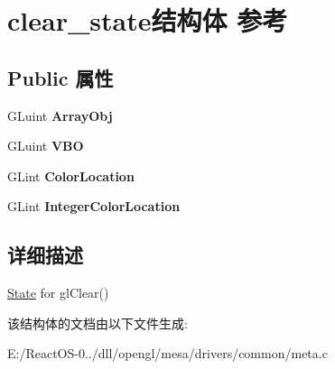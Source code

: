 \hypertarget{structclear__state}{}\section{clear\+\_\+state结构体 参考}
\label{structclear__state}
\subsection*{Public 属性}
\begin{DoxyCompactItemize}
\item 
\mbox{\label{structclear__state_a70f2eaa71e9ce6cd0366f0253c5ce3e6}} 
G\+Luint {\bfseries Array\+Obj}
\item 
\mbox{\label{structclear__state_a6f96bf8a7f8737a5ef5cfdd255371369}} 
G\+Luint {\bfseries V\+BO}
\item 
\mbox{\label{structclear__state_ada1f877338ee07583d9ab06d4a3ddd66}} 
G\+Lint {\bfseries Color\+Location}
\item 
\mbox{\label{structclear__state_a36a6f087b7decb6fe3b80a1a9cd8f06d}} 
G\+Lint {\bfseries Integer\+Color\+Location}
\end{DoxyCompactItemize}


\subsection{详细描述}
\hyperlink{struct_state}{State} for gl\+Clear() 

该结构体的文档由以下文件生成\+:\begin{DoxyCompactItemize}
\item 
E\+:/\+React\+O\+S-\/0../dll/opengl/mesa/drivers/common/meta.\+c\end{DoxyCompactItemize}
